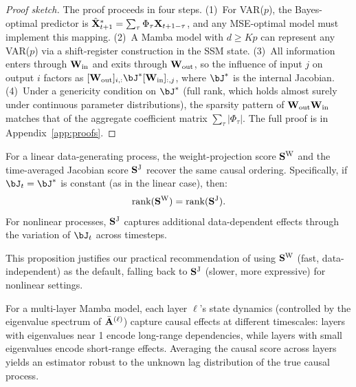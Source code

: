 \begin{proof}[Proof sketch]
The proof proceeds in four steps. (1)~For VAR($p$), the Bayes-optimal
predictor is $\hat{\mathbf{X}}_{t+1}^* = \sum_\tau \Phi_\tau \mathbf{X}_{t+1-\tau}$,
and any MSE-optimal model must implement this mapping. (2)~A Mamba model
with $d \geq Kp$ can represent any VAR($p$) via a shift-register
construction in the SSM state. (3)~All information enters through
$\mathbf{W}_{\text{in}}$ and exits through $\mathbf{W}_{\text{out}}$, so the
influence of input $j$ on output $i$ factors as
$[\bW_{\text{out}}]_{i,:} \bJ^* [\bW_{\text{in}}]_{:,j}$, where
$\bJ^*$ is the internal Jacobian. (4)~Under a genericity condition
on $\bJ^*$ (full rank, which holds almost surely under continuous
parameter distributions), the sparsity pattern of
$\mathbf{W}_{\text{out}} \mathbf{W}_{\text{in}}$ matches that of the aggregate
coefficient matrix $\sum_\tau |\Phi_\tau|$. The full proof is in
Appendix~\ref{app:proofs}.
\end{proof}

\begin{proposition}
\label{prop:wj_consistency}
For a linear data-generating process, the weight-projection score
$\mathbf{S}^{\text{W}}$ and the time-averaged Jacobian score $\mathbf{S}^{\text{J}}$
recover the same causal ordering. Specifically, if $\bJ_t = \bJ^*$
is constant (as in the linear case), then:
\begin{equation}
    \text{rank}(\mathbf{S}^{\text{W}}) = \text{rank}(\mathbf{S}^{\text{J}}).
\end{equation}
For nonlinear processes, $\mathbf{S}^{\text{J}}$ captures additional
data-dependent effects through the variation of $\bJ_t$ across
timesteps.
\end{proposition}

This proposition justifies our practical recommendation of using
$\mathbf{S}^{\text{W}}$ (fast, data-independent) as the default, falling
back to $\mathbf{S}^{\text{J}}$ (slower, more expressive) for nonlinear
settings.

\begin{proposition}
\label{prop:layer_agg}
For a multi-layer Mamba model, each layer $\ell$'s state dynamics
(controlled by the eigenvalue spectrum of $\bar{\mathbf{A}}^{(\ell)}$)
capture causal effects at different timescales: layers with
eigenvalues near 1 encode long-range dependencies, while layers with
small eigenvalues encode short-range effects. Averaging the causal
score across layers yields an estimator robust to the unknown lag
distribution of the true causal process.
\end{proposition}

